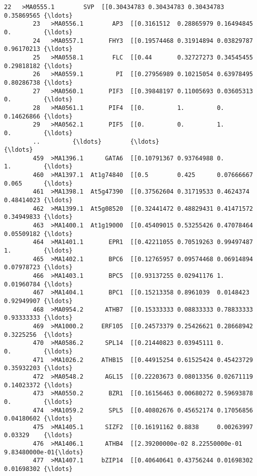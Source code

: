 \documentclass[11pt]{article}
\begin{document}
\begin{Verbatim}[commandchars=\\\{\}]
        22   >MA0555.1        SVP  [[0.30434783 0.30434783 0.30434783 0.35869565 {\ldots}   
        23   >MA0556.1        AP3  [[0.3161512  0.28865979 0.16494845 0.         {\ldots}   
        24   >MA0557.1       FHY3  [[0.19574468 0.31914894 0.03829787 0.96170213 {\ldots}   
        25   >MA0558.1        FLC  [[0.44       0.32727273 0.34545455 0.29818182 {\ldots}   
        26   >MA0559.1         PI  [[0.27956989 0.10215054 0.63978495 0.80286738 {\ldots}   
        27   >MA0560.1       PIF3  [[0.39848197 0.11005693 0.03605313 0.         {\ldots}   
        28   >MA0561.1       PIF4  [[0.         1.         0.         0.14626866 {\ldots}   
        29   >MA0562.1       PIF5  [[0.         0.         1.         0.         {\ldots}   
        ..         {\ldots}        {\ldots}                                                {\ldots}   
        459  >MA1396.1      GATA6  [[0.10791367 0.93764988 0.         1.         {\ldots}   
        460  >MA1397.1  At1g74840  [[0.5        0.425      0.07666667 0.065      {\ldots}   
        461  >MA1398.1  At5g47390  [[0.37562604 0.31719533 0.4624374  0.48414023 {\ldots}   
        462  >MA1399.1  At5g08520  [[0.32441472 0.48829431 0.41471572 0.34949833 {\ldots}   
        463  >MA1400.1  At1g19000  [[0.45409015 0.53255426 0.47078464 0.05509182 {\ldots}   
        464  >MA1401.1       EPR1  [[0.42211055 0.70519263 0.99497487 1.         {\ldots}   
        465  >MA1402.1       BPC6  [[0.12765957 0.09574468 0.06914894 0.07978723 {\ldots}   
        466  >MA1403.1       BPC5  [[0.93137255 0.02941176 1.         0.01960784 {\ldots}   
        467  >MA1404.1       BPC1  [[0.15213358 0.8961039  0.0148423  0.92949907 {\ldots}   
        468  >MA0954.2      ATHB7  [[0.15333333 0.08833333 0.78833333 0.93333333 {\ldots}   
        469  >MA1000.2     ERF105  [[0.24573379 0.25426621 0.28668942 0.3225256  {\ldots}   
        470  >MA0586.2      SPL14  [[0.21440823 0.03945111 0.         0.         {\ldots}   
        471  >MA1026.2     ATHB15  [[0.44915254 0.61525424 0.45423729 0.35932203 {\ldots}   
        472  >MA0548.2      AGL15  [[0.22203673 0.08013356 0.02671119 0.14023372 {\ldots}   
        473  >MA0550.2       BZR1  [[0.16156463 0.00680272 0.59693878 0.         {\ldots}   
        474  >MA1059.2       SPL5  [[0.40802676 0.45652174 0.17056856 0.04180602 {\ldots}   
        475  >MA1405.1      SIZF2  [[0.16191162 0.8838     0.00263997 0.03329    {\ldots}   
        476  >MA1406.1      ATHB4  [[2.39200000e-02 8.22550000e-01 9.83480000e-01{\ldots}   
        477  >MA1407.1     bZIP14  [[0.40640641 0.43756244 0.01698302 0.01698302 {\ldots}   

\end{Verbatim}
\end{document}
